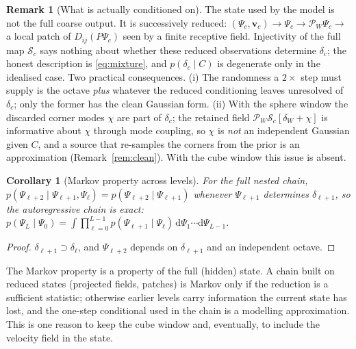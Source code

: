 \documentclass[11pt]{article}
\newtheorem{corollary}[proposition]{Corollary}
\theoremstyle{definition}
\newtheorem{remark}[proposition]{Remark}
\newcommand{\Psic}{\Psi_{c}}
\newcommand{\PW}{\mathcal{P}_W}
\newcommand{\dd}{\mathrm{d}}
\newcommand{\Nbody}{\mathcal{S}}
\begin{document}
\begin{remark}[What is actually conditioned on]
The state used by the model is not the full coarse output. It is successively reduced: $(\Psic,\mathbf v_c)\to\Psic\to\PW\Psic\to$ a local patch of $D_{ij}(P\Psic)$ seen by a finite receptive field. Injectivity of the full map $\Nbody_c$ says nothing about whether these reduced observations determine $\delta_c$; the honest description is \eqref{eq:mixture}, and $p(\delta_c\mid C)$ is degenerate only in the idealised case. Two practical consequences. (i) The randomness a $2\times$ step must supply is the octave \emph{plus} whatever the reduced conditioning leaves unresolved of $\delta_c$; only the former has the clean Gaussian form. (ii) With the sphere window the discarded corner modes $\chi$ are part of $\delta_c$; the retained field $\PW\Nbody_c[\delta_W+\chi]$ is informative about $\chi$ through mode coupling, so $\chi$ is \emph{not} an independent Gaussian given $C$, and a source that re-samples the corners from the prior is an approximation (Remark~\ref{rem:clean}). With the cube window this issue is absent.
\end{remark}

\begin{corollary}[Markov property across levels]
For the full nested chain, $p(\Psi_{\ell+2}\mid\Psi_{\ell+1},\Psi_\ell)=p(\Psi_{\ell+2}\mid\Psi_{\ell+1})$ whenever $\Psi_{\ell+1}$ determines $\delta_{\ell+1}$, so the autoregressive chain is exact:
$p(\Psi_{L}\mid\Psi_0)=\int\prod_{\ell=0}^{L-1}p(\Psi_{\ell+1}\mid\Psi_\ell)\,\dd\Psi_1\cdots\dd\Psi_{L-1}$.
\end{corollary}
\begin{proof}
$\delta_{\ell+1}\supset\delta_\ell$, and $\Psi_{\ell+2}$ depends on $\delta_{\ell+1}$ and an independent octave.
\end{proof}
The Markov property is a property of the full (hidden) state. A chain built on reduced states (projected fields, patches) is Markov only if the reduction is a sufficient statistic; otherwise earlier levels carry information the current state has lost, and the one-step conditional used in the chain is a modelling approximation. This is one reason to keep the cube window and, eventually, to include the velocity field in the state.
\end{document}
